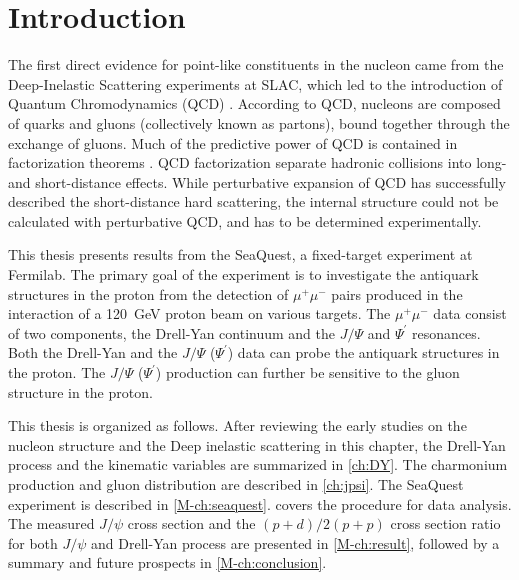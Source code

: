 \documentclass[../main.tex]{subfiles}
\begin{document}
\ifSubfilesClassLoaded{\mainmatter}{}

\chapter{Introduction}
\label{ch:intro}
The first direct evidence for point-like constituents in the nucleon came
from the Deep-Inelastic Scattering experiments at SLAC\cite{breidenbach1969},
which led to the introduction of Quantum Chromodynamics (QCD) \cite{fritzsch1972,fritzsch1973}.
According to QCD, nucleons are composed of quarks and gluons (collectively known as partons),
bound together through the exchange of gluons. Much of the predictive power of QCD
is contained in factorization theorems \cite{collins1989}. QCD factorization separate
hadronic collisions into long- and short-distance effects. While perturbative expansion
of QCD has successfully described the short-distance hard scattering, the internal
structure could not be calculated with perturbative QCD, and has to be determined
experimentally.

This thesis presents results from the SeaQuest,
a fixed-target experiment at Fermilab.
The primary goal of the experiment is to investigate the antiquark structures
in the proton from the detection of $\mu^+\mu^-$ pairs produced in
the interaction of a \SI{120}{\GeV} proton beam on various targets.
The $\mu^+\mu^-$ data consist of two components, the Drell-Yan continuum
and the  $J/\Psi$ and $\Psi^\prime$ resonances.
Both the Drell-Yan and the $J/\Psi$ ($\Psi^\prime$) data can probe the antiquark structures in the proton.
The $J/\Psi$ ($\Psi^\prime$) production can further be sensitive to the gluon structure in the proton.

This thesis is organized as follows. After reviewing the early studies
on the nucleon structure and the Deep inelastic scattering in this chapter,
the Drell-Yan process and the kinematic variables are summarized in
\cref{ch:DY}. The charmonium production and gluon distribution are described
in \cref{ch:jpsi}. The SeaQuest experiment is described in \cref{M-ch:seaquest}.
 covers the procedure for data analysis. The measured $J/\psi$
cross section and the $(p+d)/2(p+p)$ cross section ratio for both $J/\psi$ and Drell-Yan process
are presented in \cref{M-ch:result}, followed by a summary and future prospects
in \cref{M-ch:conclusion}.
\end{document}
